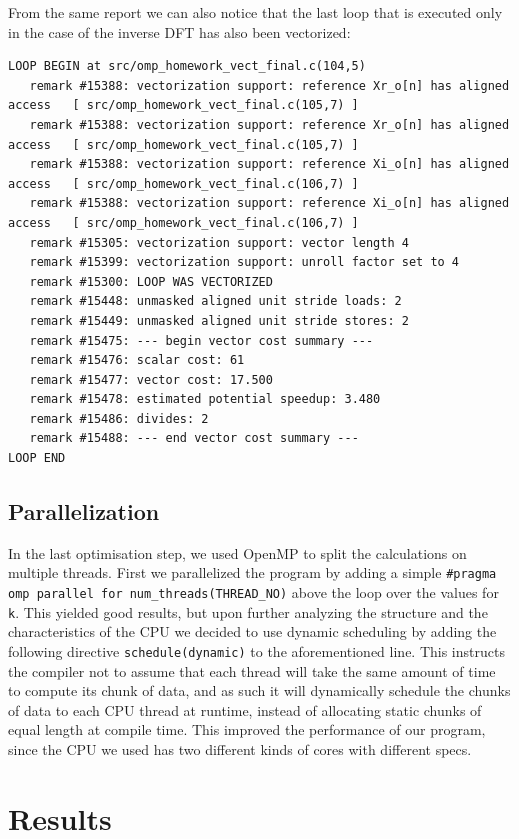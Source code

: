 \documentclass{article}
\begin{document}
From the same report we can also notice that the last loop that is executed only in the case of the inverse DFT has also been vectorized:
\begin{verbatim}
LOOP BEGIN at src/omp_homework_vect_final.c(104,5)
   remark #15388: vectorization support: reference Xr_o[n] has aligned access   [ src/omp_homework_vect_final.c(105,7) ]
   remark #15388: vectorization support: reference Xr_o[n] has aligned access   [ src/omp_homework_vect_final.c(105,7) ]
   remark #15388: vectorization support: reference Xi_o[n] has aligned access   [ src/omp_homework_vect_final.c(106,7) ]
   remark #15388: vectorization support: reference Xi_o[n] has aligned access   [ src/omp_homework_vect_final.c(106,7) ]
   remark #15305: vectorization support: vector length 4
   remark #15399: vectorization support: unroll factor set to 4
   remark #15300: LOOP WAS VECTORIZED
   remark #15448: unmasked aligned unit stride loads: 2 
   remark #15449: unmasked aligned unit stride stores: 2 
   remark #15475: --- begin vector cost summary ---
   remark #15476: scalar cost: 61 
   remark #15477: vector cost: 17.500 
   remark #15478: estimated potential speedup: 3.480 
   remark #15486: divides: 2 
   remark #15488: --- end vector cost summary ---
LOOP END
\end{verbatim}

\subsection{Parallelization}
In the last optimisation step, we used OpenMP to split the calculations on multiple threads.
First we parallelized the program by adding a simple \verb|#pragma omp parallel for num_threads(THREAD_NO)| above the loop over the values for \verb|k|. This yielded good results, but upon further analyzing the structure and the characteristics of the CPU we decided to use dynamic scheduling by adding the following directive \verb|schedule(dynamic)| to the aforementioned line. This instructs the compiler not to assume that each thread will take the same amount of time to compute its chunk of data, and as such it will dynamically schedule the chunks of data to each CPU thread at runtime, instead of allocating static chunks of equal length at compile time. This improved the performance of our program, since the CPU we used has two different kinds of cores with different specs.


\section{Results}
\end{document}
